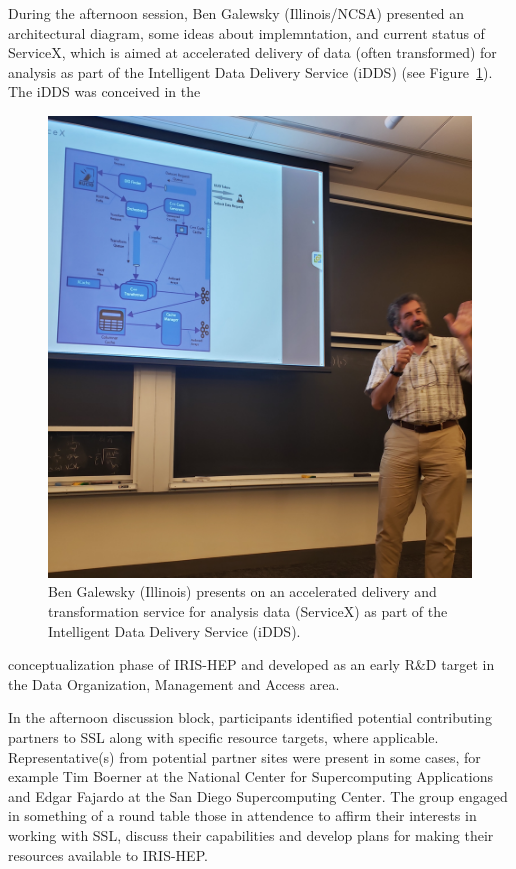 \documentclass[11pt,letterpaper,fleqn]{article}
\begin{document}
\vspace{-0.2cm}
During the afternoon session, Ben Galewsky (Illinois/NCSA) presented an architectural diagram, some ideas about implemntation, and current status of ServiceX, which is aimed at accelerated delivery of data (often transformed) for analysis as part of the Intelligent Data Delivery Service (iDDS) (see Figure~\ref{fig:galewsky_servicex}). The iDDS was conceived in the
\begin{figure}
  \centering
  \includegraphics[width=0.9\linewidth]{figures/galewsky_servicex.jpg}
  \vspace{-0.3cm}
  \caption{Ben Galewsky (Illinois) presents on an accelerated delivery and transformation service for analysis data (ServiceX) as part of the Intelligent Data Delivery Service (iDDS).}
  \label{fig:galewsky_servicex}
\end{figure}
conceptualization phase of IRIS-HEP and developed as an early R\&D target in the Data Organization, Management and Access area.

In the afternoon discussion block, participants identified potential contributing partners to SSL along with specific resource targets, where applicable. Representative(s) from potential partner sites were present in some cases, for example Tim Boerner at the National Center for Supercomputing Applications and Edgar Fajardo at the San Diego Supercomputing Center. The group engaged in something of a round table those in attendence to affirm their interests in working with SSL, discuss their capabilities and develop plans for making their resources available to IRIS-HEP.
\end{document}
